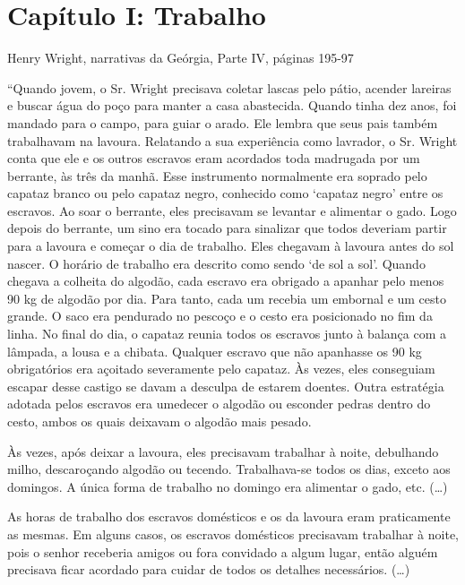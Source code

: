 \chapter{Capítulo I: Trabalho}

Henry Wright, narrativas da Geórgia, Parte IV, páginas 195-97

``Quando jovem, o Sr. Wright precisava coletar lascas pelo pátio,
acender lareiras e buscar água do poço para manter a casa abastecida.
Quando tinha dez anos, foi mandado para o campo, para guiar o arado. Ele
lembra que seus pais também trabalhavam na lavoura. Relatando a sua
experiência como lavrador, o Sr. Wright conta que ele e os outros
escravos eram acordados toda madrugada por um berrante, às três da
manhã. Esse instrumento normalmente era soprado pelo capataz branco ou
pelo capataz negro, conhecido como `capataz negro' entre os escravos. Ao
soar o berrante, eles precisavam se levantar e alimentar o gado. Logo
depois do berrante, um sino era tocado para sinalizar que todos deveriam
partir para a lavoura e começar o dia de trabalho. Eles chegavam à
lavoura antes do sol nascer. O horário de trabalho era descrito como
sendo `de sol a sol'. Quando chegava a colheita do algodão, cada escravo
era obrigado a apanhar pelo menos 90 kg de algodão por dia. Para tanto,
cada um recebia um embornal e um cesto grande. O saco era pendurado no
pescoço e o cesto era posicionado no fim da linha. No final do dia, o
capataz reunia todos os escravos junto à balança com a lâmpada, a lousa
e a chibata. Qualquer escravo que não apanhasse os 90 kg obrigatórios
era açoitado severamente pelo capataz. Às vezes, eles conseguiam escapar
desse castigo se davam a desculpa de estarem doentes. Outra estratégia
adotada pelos escravos era umedecer o algodão ou esconder pedras dentro
do cesto, ambos os quais deixavam o algodão mais pesado.

Às vezes, após deixar a lavoura, eles precisavam trabalhar à noite,
debulhando milho, descaroçando algodão ou tecendo. Trabalhava-se todos
os dias, exceto aos domingos. A única forma de trabalho no domingo era
alimentar o gado, etc. (\ldots{})

As horas de trabalho dos escravos domésticos e os da lavoura eram
praticamente as mesmas. Em alguns casos, os escravos domésticos
precisavam trabalhar à noite, pois o senhor receberia amigos ou fora
convidado a algum lugar, então alguém precisava ficar acordado para
cuidar de todos os detalhes necessários. (\ldots{})

